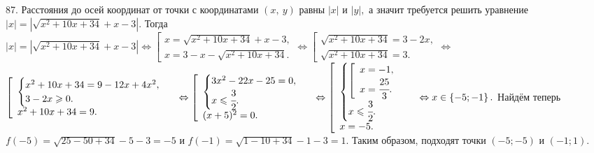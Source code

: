 \documentclass[12pt]{article}
\begin{document}
87. Расстояния до осей координат от точки с координатами $(x,\ y)$ равны $|x|$ и $|y|,$ а значит требуется решить уравнение $|x|=|\sqrt{x^2+10x+34}+x-3|.$ Тогда $|x|=|\sqrt{x^2+10x+34}+x-3|\Leftrightarrow \left[\begin{array}{l} x=\sqrt{x^2+10x+34}+x-3,\\ x=3-x-\sqrt{x^2+10x+34}.\end{array}\right.\Leftrightarrow \left[\begin{array}{l} \sqrt{x^2+10x+34}=3-2x,\\ \sqrt{x^2+10x+34}=3.\end{array}\right.\Leftrightarrow$\\$ \left[\begin{array}{l} \begin{cases} x^2+10x+34=9-12x+4x^2,\\ 3-2x\geqslant0.\end{cases}\\ x^2+10x+34=9.\end{array}\right.\Leftrightarrow \left[\begin{array}{l} \begin{cases} 3x^2-22x-25=0,\\ x\leqslant\cfrac{3}{2}.\end{cases}\\ (x+5)^2=0.\end{array}\right.\Leftrightarrow \left[\begin{array}{l} \begin{cases} \left[\begin{array}{l} x=-1,\\ x=\cfrac{25}{3}.\end{array}\right.\\ x\leqslant\cfrac{3}{2}.\end{cases}\\ x=-5.\end{array}\right.\Leftrightarrow x\in\left\{-5;-1\right\}.$
Найдём теперь $f(-5)=\sqrt{25-50+34}-5-3=-5$ и $f\left(-1\right)=\sqrt{1-10+34}-1-3=1.$
Таким образом, подходят точки $(-5; -5)$ и $\left(-1;1\right).$\\
\end{document}
